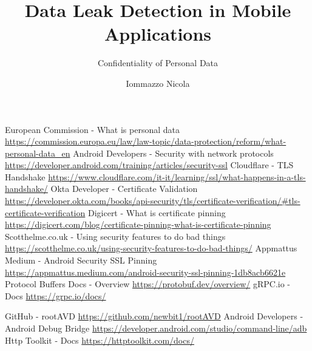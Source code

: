 \documentclass[a4paper, binding=0.6cm, noexaminfo, english]{sapthesis}
\title{Data Leak Detection in Mobile Applications}
\subtitle{Confidentiality of Personal Data}
\author{Iommazzo Nicola}
\begin{document}
	\frontmatter
	
		\maketitle
	
		
		

		\tableofcontents

	\mainmatter
	
		
		
		
		
		

	\backmatter

		\cleardoublepage
		
		\begin{thebibliography}{99}
			 European Commission - What is personal data \newline
			\url{https://commission.europa.eu/law/law-topic/data-protection/reform/what-personal-data_en}
			 Android Developers - Security with network protocols \newline
			\url{https://developer.android.com/training/articles/security-ssl}
			 Cloudflare - TLS Handshake \newline
			\url{https://www.cloudflare.com/it-it/learning/ssl/what-happens-in-a-tls-handshake/}
			 Okta Developer - Certificate Validation \newline
			\url{https://developer.okta.com/books/api-security/tls/certificate-verification/#tls-certificate-verification}	
			 Digicert - What is certificate pinning \newline
			\url{https://digicert.com/blog/certificate-pinning-what-is-certificate-pinning}				
			 Scotthelme.co.uk - Using security features to do bad things \newline
			\url{https://scotthelme.co.uk/using-security-features-to-do-bad-things/}
			 Appmattus Medium - Android Security SSL Pinning \newline
			\url{https://appmattus.medium.com/android-security-ssl-pinning-1db8acb6621e}	
			 Protocol Buffers Docs - Overview \newline
			\url{https://protobuf.dev/overview/}
			 gRPC.io - Docs \newline
			\url{https://grpc.io/docs/}
			
			 GitHub - rootAVD \newline
			\url{https://github.com/newbit1/rootAVD}
			 Android Developers - Android Debug Bridge \newline
			\url{https://developer.android.com/studio/command-line/adb}
			 Http Toolkit - Docs \newline
			\url{https://httptoolkit.com/docs/}
			

		\end{thebibliography}
\end{document}
